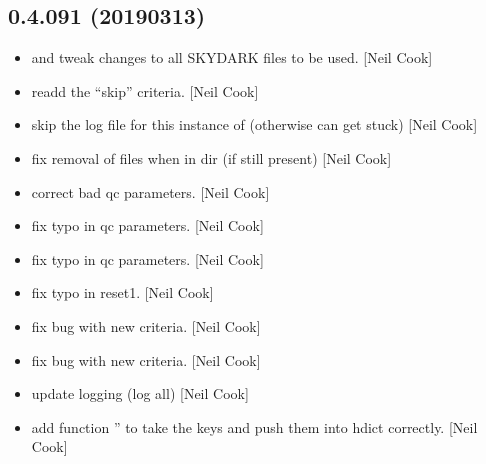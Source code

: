 \documentclass[a4paper,10pt,english]{report}
\begin{document}
\subsection{0.4.091 (2019\sphinxhyphen{}03\sphinxhyphen{}13)}
\label{\detokenize{misc/changelog:id188}}\begin{itemize}
\item {} 
 and  \sphinxhyphen{} tweak changes to all SKYDARK
files to be used. {[}Neil Cook{]}

\item {} 
 \sphinxhyphen{} readd the “skip” criteria. {[}Neil Cook{]}

\item {} 
 \sphinxhyphen{} skip the log file for this instance of 
(otherwise can get stuck) {[}Neil Cook{]}

\item {} 
 \sphinxhyphen{} fix removal of files when in dir (if still present)
{[}Neil Cook{]}

\item {} 
 \sphinxhyphen{} correct bad qc parameters. {[}Neil Cook{]}

\item {} 
 \sphinxhyphen{} fix typo in qc parameters. {[}Neil Cook{]}

\item {} 
 \sphinxhyphen{} fix typo in qc parameters. {[}Neil Cook{]}

\item {} 
 \sphinxhyphen{} fix typo in reset1. {[}Neil Cook{]}

\item {} 
 \sphinxhyphen{} fix bug with new  criteria. {[}Neil
Cook{]}

\item {} 
 \sphinxhyphen{} fix bug with new  criteria. {[}Neil
Cook{]}

\item {} 
 \sphinxhyphen{} update logging (log all) {[}Neil Cook{]}

\item {} 
 \sphinxhyphen{} add function ” to take the keys and push
them into hdict correctly. {[}Neil Cook{]}


\end{itemize}
\end{document}
